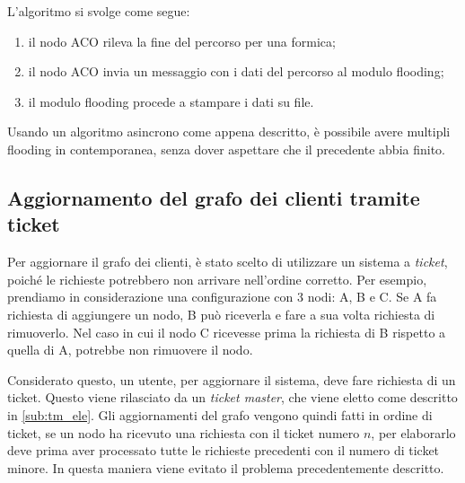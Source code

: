 L'algoritmo si svolge come segue:
\begin{enumerate}
    \item il nodo ACO rileva la fine del percorso per una formica;
    \item il nodo ACO invia un messaggio con i dati del percorso al modulo flooding;
    \item il modulo flooding procede a stampare i dati su file.
\end{enumerate}

Usando un algoritmo asincrono come appena descritto, è possibile avere multipli flooding in contemporanea, senza dover aspettare che il precedente abbia finito.

\subsection{Aggiornamento del grafo dei clienti tramite ticket}
Per aggiornare il grafo dei clienti, è stato scelto di utilizzare un sistema a \textit{ticket}, poiché le richieste potrebbero non
arrivare nell'ordine corretto. Per esempio, prendiamo in considerazione una configurazione con 3 nodi: A, B e C.
Se A fa richiesta di aggiungere un nodo, B può riceverla e fare a sua volta richiesta di rimuoverlo. Nel caso in cui il nodo
C ricevesse prima la richiesta di B rispetto a quella di A, potrebbe non rimuovere il nodo.

Considerato questo, un utente, per aggiornare il sistema, deve fare richiesta di un ticket.
Questo viene rilasciato da un \textit{ticket master}, che viene eletto come descritto in \ref{sub:tm_ele}.
Gli aggiornamenti del grafo vengono quindi fatti in ordine di ticket, se un nodo ha ricevuto una richiesta con il ticket numero $n$, per elaborarlo
deve prima aver processato tutte le richieste precedenti con il numero di ticket minore.
In questa maniera viene evitato il problema precedentemente descritto.

